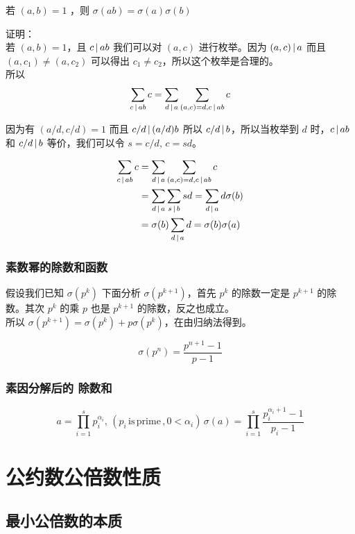 若 $(a,b) = 1$ ，则 $\sigma(ab) = \sigma(a) \sigma(b)$

证明：\\
若 $(a,b) = 1$，且 $c \,\vert\, ab$ 我们可以对 $(a,c)$ 进行枚举。因为 $(a,c) \,\vert\, a$ 而且 $(a,c_1) \ne (a,c_2)$ 可以得出 $c_1 \ne c_2$，所以这个枚举是合理的。\\
所以 
\begin{align*}
\sum_{c \,\vert\, ab} c = \sum_{d \,\vert\, a}\sum_{(a,c)=d, c \,\vert\, ab}c 
\end{align*}

因为有 $(a/d,c/d) = 1$ 而且 $c/d \,\vert\, (a/d)  b$ 所以 $c/d \,\vert\, b$，所以当枚举到 $d$ 时，$c \,\vert\, ab$ 和 $c/d \,\vert\, b$ 等价，我们可以令 $ s = c/d, \, c = sd$。

\begin{align*}
\sum_{c \,\vert\, ab} c & = \sum_{d \,\vert\, a}\sum_{(a,c)=d, c \,\vert\, ab}c \\
& = \sum_{d \,\vert\, a} \sum_{s \,\vert\, b} sd = \sum_{d \,\vert\, a} d \sigma(b) \\
& = \sigma(b) \sum_{d \,\vert\, a }d  = \sigma(b) \sigma(a)
\end{align*}


\subsubsection{素数幂的除数和函数}

假设我们已知 $\sigma(p^k)$ 下面分析 $\sigma(p^{k+1})$，首先 $p^k$ 的除数一定是 $p^{k+1}$ 的除数。其次 $p^{k}$ 的乘 $p$ 也是 $p^{k+1}$ 的除数，反之也成立。 \\
所以 $\sigma(p^{k+1}) = \sigma(p^{k}) + p \sigma(p^{k})$，在由归纳法得到。

\[
    \sigma(p^n) = \frac{p^{n+1} - 1}{p-1}
\]

\subsubsection{素因分解后的 除数和}

\[
    a= \prod_{i=1}^{s}p_i^{\alpha_i}, \, (p_i \, \mathrm{is \, prime}\,, 0 < \alpha_i) \, \sigma(a) = \prod_{i=1}^{s}\frac{p_i^{\alpha_i+1} - 1}{p_i - 1}
\]

\section{公约数公倍数性质}

\subsection{最小公倍数的本质}

